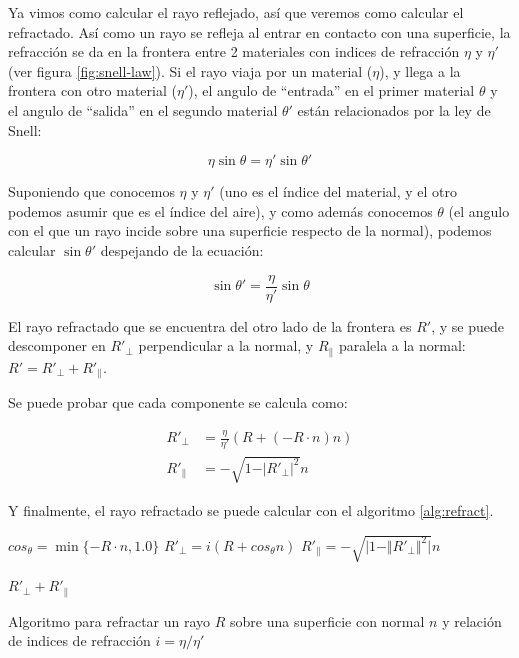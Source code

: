 Ya vimos como calcular el rayo reflejado, así que veremos como calcular el
refractado. Así como un rayo se refleja al entrar en contacto con una
superficie, la refracción se da en la frontera entre 2 materiales con indices de
refracción $\eta$ y $\eta'$ (ver figura \ref{fig:snell-law}). Si el rayo viaja
por un material ($\eta$), y llega a la frontera con otro material ($\eta'$), el
angulo de ``entrada'' en el primer material $\theta$ y el angulo de ``salida'' en el
segundo material $\theta'$ están relacionados por la ley de Snell:

\[
    \eta \sin \theta = \eta' \sin \theta'
\]

Suponiendo que conocemos $\eta$ y $\eta'$ (uno es el índice del material, y el
otro podemos asumir que es el índice del aire), y como además conocemos $\theta$
(el angulo con el que un rayo incide sobre una superficie respecto de la
normal), podemos calcular $\sin \theta'$ despejando de la ecuación:

\[
    \sin \theta' = \frac{\eta}{\eta'} \sin \theta
\]

El rayo refractado que se encuentra del otro lado de la frontera es $R'$, y se
puede descomponer en $R'_{\perp}$ perpendicular a la normal, y
$R_{\parallel}$ paralela a la normal: $R' = R'_{\perp} + R'_{\parallel}$.

Se puede probar que cada componente se calcula como:

\begin{align*}
    R'_{\perp} &= \frac{\eta}{\eta'}(R + (-R \cdot n) n) \\
    R'_{\parallel} &= - \sqrt{1 - \vert R'_{\perp} \vert^2} n
\end{align*}

Y finalmente, el rayo refractado se puede calcular con el algoritmo
\ref{alg:refract}.

\begin{algorithm}[H]
\begin{algorithmic}[1]

    \State $cos_{\theta} = \min\{-R \cdot n, 1.0\}$
    \State $R'_{\perp} = i (R + cos_{\theta} n)$
    \State $R'_{\parallel} = - \sqrt{\vert 1 - \Vert R'_{\perp} \Vert ^ 2 \vert} n$

    \State \Return $R'_{\perp} + R'_{\parallel}$
\EndFunction
\end{algorithmic}
\caption{Algoritmo para refractar un rayo $R$ sobre una superficie con normal
$n$ y relación de indices de refracción $i = \eta / \eta'$}
\label{alg:refract}
\end{algorithm}

